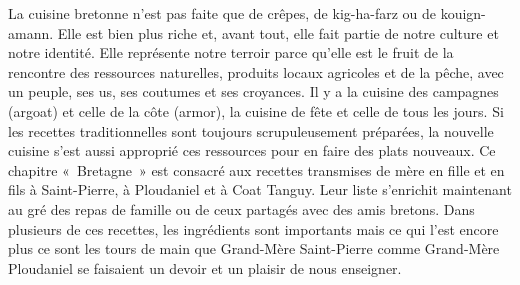 La cuisine bretonne n’est pas faite que de crêpes, de kig-ha-farz ou de kouign-amann. Elle est bien plus riche et, avant tout, elle fait partie de notre culture et notre identité. Elle représente notre terroir parce qu’elle est le fruit de la rencontre des ressources naturelles, produits locaux agricoles et de la pêche, avec un peuple, ses us, ses coutumes et ses croyances. Il y a la cuisine des campagnes (argoat) et celle de la côte (armor), la cuisine de fête et celle de tous les jours. Si les recettes traditionnelles sont toujours scrupuleusement préparées, la nouvelle cuisine s’est aussi approprié ces ressources pour en faire des plats nouveaux.
Ce chapitre « Bretagne » est consacré aux recettes transmises de mère en fille et en fils à Saint-Pierre, à Ploudaniel et à Coat Tanguy. Leur liste s’enrichit maintenant au gré des repas de famille ou de ceux partagés avec des amis bretons. Dans plusieurs de ces recettes, les ingrédients sont importants mais ce qui l’est encore plus ce sont les tours de main que Grand-Mère Saint-Pierre comme Grand-Mère Ploudaniel se faisaient un devoir et un plaisir de nous enseigner.
